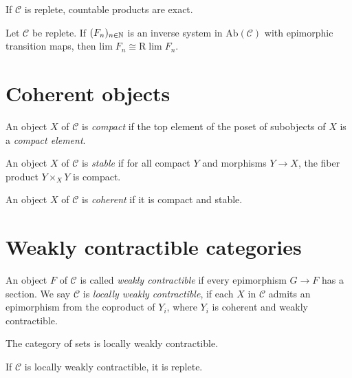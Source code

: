 \begin{proposition}
    If $\mathcal{C}$ is replete, countable products are exact.
    \label{prop:replete-products-exact}
\end{proposition}

\begin{proposition}
    Let $\mathcal{C}$ be replete.
    If $(F_n)_{n \in \mathbb{N}}$ is an inverse system in $\mathrm{Ab}(\mathcal{C})$ with
    epimorphic transition maps, then $\mathrm{lim} \; F_n \cong \mathrm{R}\; \mathrm{lim} \; F_n$.
    \label{prop:lim-exact-replete}
\end{proposition}

\section{Coherent objects}

\begin{definition}
    An object $X$ of $\mathcal{C}$ is \emph{compact} if the top element of the poset
    of subobjects of $X$ is a \emph{compact element}.
    \label{def:compact-object}
\end{definition}

\begin{definition}
    An object $X$ of $\mathcal{C}$ is \emph{stable} if for all compact $Y$ and morphisms $Y \to X$,
    the fiber product $Y \times_{X} Y$ is compact.
    \label{def:stable-object}
\end{definition}

\begin{definition}
    An object $X$ of $\mathcal{C}$ is \emph{coherent} if it is compact and stable.
    \label{def:coherent-object}
\end{definition}

\section{Weakly contractible categories}

\begin{definition}
    An object $F$ of $\mathcal{C}$ is called \emph{weakly contractible} if every epimorphism
    $G \to F$ has a section. We say $\mathcal{C}$ is \emph{locally weakly contractible},
    if each $X$ in $\mathcal{C}$ admits an epimorphism from the coproduct of $Y_i$,
    where $Y_i$ is coherent and weakly contractible.
    \label{def:lwc}
\end{definition}

\begin{example}
    The category of sets is locally weakly contractible.
\end{example}

\begin{proposition}
    If $\mathcal{C}$ is locally weakly contractible, it is replete.
    \label{prop:lwc-replete}
\end{proposition}
